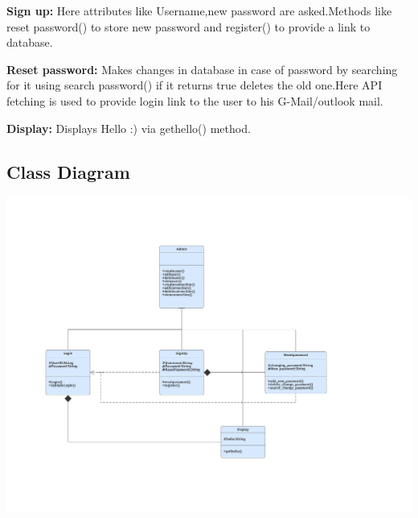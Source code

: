 \documentclass[11pt, english]{article}
\begin{document}
\newline
\item\textbf{Sign up:}
\newline
\newline Here attributes like Username,new password are asked.Methods like reset password() to store new password and register() to provide a link to database.
\newline
\item\textbf{Reset password:}
\newline
\newline Makes changes in database in case of password by searching for it using search password() if it returns true deletes the old one.Here API fetching is used to provide login link to the user to his G-Mail/outlook mail.
\newline
\item\textbf{Display:}
\newline
\newline Displays Hello :) via gethello() method.




\subsection{Class Diagram}

\includegraphics[width=200mm,scale=5.0]{ClassDiagram.png}
\end{document}
